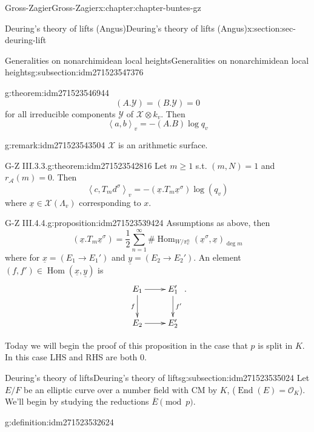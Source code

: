 \documentclass[oneside,10pt,]{book}
\numberwithin{equation}{section}
\newcommand{\pair}[2]{\left\langle #1, #2 \right\rangle}
\newcommand{\ints}{\mathcal{O}}
\DeclareMathOperator{\End}{End}
\DeclareMathOperator{\Hom}{Hom}
\begin{document}
\begin{chapterptx}{Gross-Zagier}{}{Gross-Zagier}{}{}{x:chapter:chapter-buntes-gz}
\begin{sectionptx}{Deuring's theory of lifts (Angus)}{}{Deuring's theory of lifts (Angus)}{}{}{x:section:sec-deuring-lift}
\begin{subsectionptx}{Generalities on nonarchimidean local heights}{}{Generalities on nonarchimidean local heights}{}{}{g:subsection:idm271523547376}
\begin{theorem}{}{}{g:theorem:idm271523546944}
\begin{equation*}
(A. \mathcal Y) = (B. \mathcal Y) = 0
\end{equation*}
for all irreducible components \(\mathcal Y\) of \(\mathcal X\otimes k_v\). Then%
\begin{equation*}
\pair ab_v = -(A.B) \log q_v
\end{equation*}
%
\end{theorem}
\begin{remark}{}{g:remark:idm271523543504}%
\(\mathcal X\) is an arithmetic surface.%
\end{remark}
\begin{theorem}{G-Z III.3.3.}{}{g:theorem:idm271523542816}%
Let \(m \ge 1\) s.t. \((m,N) = 1\) and \(r_{\mathscr A}(m)= 0\). Then%
\begin{equation*}
\pair c{T_m d^\sigma }_v = -(\underline x. T_m \underline x^\sigma ) \log(q_v)
\end{equation*}
where \(\underline x \in \mathcal X(\Lambda _v)\) corresponding to \(x\).%
\end{theorem}
\begin{proposition}{G-Z III.4.4.}{}{g:proposition:idm271523539424}%
Assumptions as  above, then%
\begin{equation*}
(\underline x. T_m \underline x^\sigma ) = \frac12 \sum_{n=1}^\infty  \#\Hom_{W/\pi _v^n}(\underline x^\sigma , \underline x)_{\deg m}
\end{equation*}
where for \(\underline x = (E_1 \to E_1')\) and \(\underline y = (E_2 \to E_2')\). An element \((f,f') \in \Hom(\underline x,\underline y) \) is%
\begin{equation*}
\xymatrix{
E_1 \ar[r] \ar[d]_{f} & E_1' \ar[d]^{f'}\\
E_2 \ar[r] & E_2'}\text{.}
\end{equation*}
%
\end{proposition}
Today we will begin the proof of this proposition in the case that \(p\) is split in \(K\). In this case LHS and RHS are both 0.%
\end{subsectionptx}
%
%
\typeout{************************************************}
\typeout{************************************************}
%
\begin{subsectionptx}{Deuring's theory of lifts}{}{Deuring's theory of lifts}{}{}{g:subsection:idm271523535024}
Let \(E/F\) be an elliptic curve over a number field with CM by \(K\), (\(\End (E) = \ints_K\)). We'll begin by studying the reductions \(\overline E \pmod p\).%
\begin{definition}{}{g:definition:idm271523532624}%

\end{definition}
\end{subsectionptx}
\end{sectionptx}
\end{chapterptx}
\end{document}
